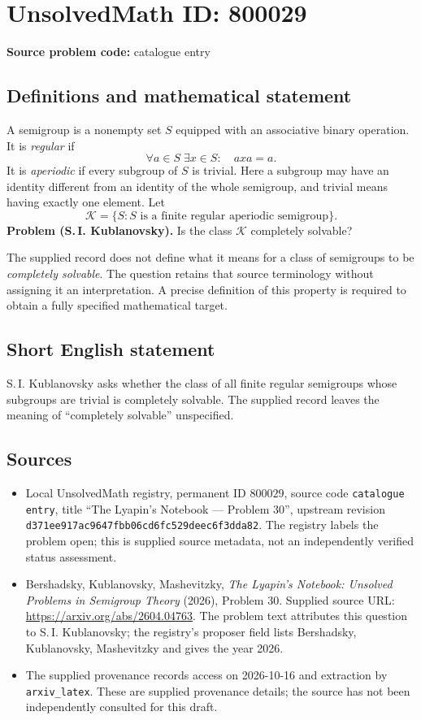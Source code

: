 \documentclass[11pt]{article}
\begin{document}
\section*{UnsolvedMath ID: 800029}
\textbf{Source problem code:} catalogue entry
\subsection{Definitions and mathematical statement}
A semigroup is a nonempty set \(S\) equipped with an associative binary operation. It is \emph{regular} if
\[
\forall a\in S\;\exists x\in S:\quad axa=a.
\]
It is \emph{aperiodic} if every subgroup of \(S\) is trivial. Here a subgroup may have an identity different from an identity of the whole semigroup, and trivial means having exactly one element. Let
\[
\mathcal{K}=\{S: S\text{ is a finite regular aperiodic semigroup}\}.
\]
\textbf{Problem (S.\,I. Kublanovsky).} Is the class \(\mathcal{K}\) completely solvable?

The supplied record does not define what it means for a class of semigroups to be \emph{completely solvable}. The question retains that source terminology without assigning it an interpretation. A precise definition of this property is required to obtain a fully specified mathematical target.
\subsection{Short English statement}
S.\,I. Kublanovsky asks whether the class of all finite regular semigroups whose subgroups are trivial is completely solvable. The supplied record leaves the meaning of ``completely solvable'' unspecified.
\subsection{Sources}
\begin{itemize}
\item Local UnsolvedMath registry, permanent ID \(800029\), source code \texttt{catalogue entry}, title ``The Lyapin's Notebook --- Problem 30'', upstream revision \texttt{d371ee917ac9647fbb06cd6fc529deec6f3dda82}. The registry labels the problem open; this is supplied source metadata, not an independently verified status assessment.
\item Bershadsky, Kublanovsky, Mashevitzky, \emph{The Lyapin's Notebook: Unsolved Problems in Semigroup Theory} (2026), Problem 30. Supplied source URL: \url{https://arxiv.org/abs/2604.04763}. The problem text attributes this question to S.\,I. Kublanovsky; the registry's proposer field lists Bershadsky, Kublanovsky, Mashevitzky and gives the year 2026.
\item The supplied provenance records access on 2026-10-16 and extraction by \texttt{arxiv\_latex}. These are supplied provenance details; the source has not been independently consulted for this draft.
\end{itemize}
\end{document}
